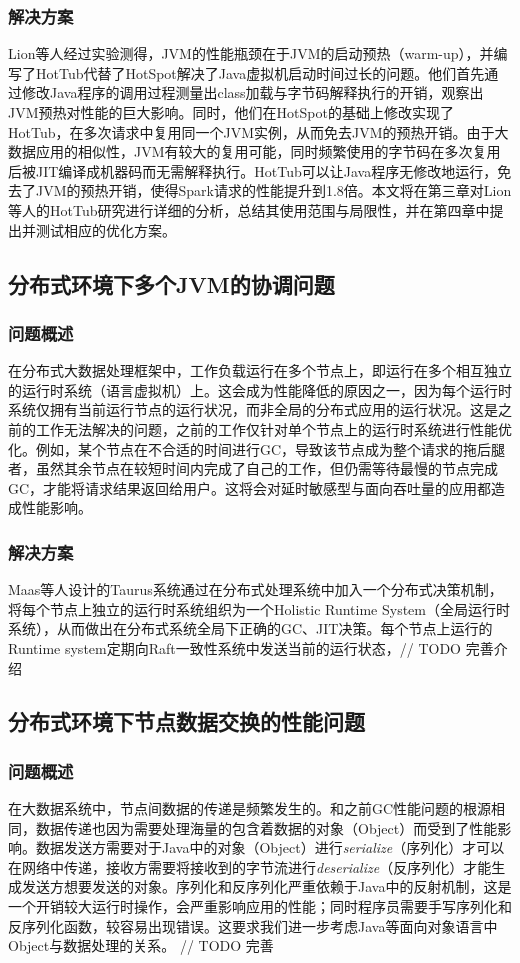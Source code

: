 \documentclass[lang=cn,11pt,a4paper,cite=authoryear]{elegantpaper}
\begin{document}
\subsubsection{解决方案}
Lion等人经过实验测得，JVM的性能瓶颈在于JVM的启动预热（warm-up），并编写了HotTub代替了HotSpot\cite{DBLP:conf/osdi/LionCSZGY16}解决了Java虚拟机启动时间过长的问题。他们首先通过修改Java程序的调用过程测量出class加载与字节码解释执行的开销，观察出JVM预热对性能的巨大影响。同时，他们在HotSpot的基础上修改实现了HotTub，在多次请求中复用同一个JVM实例，从而免去JVM的预热开销。由于大数据应用的相似性，JVM有较大的复用可能，同时频繁使用的字节码在多次复用后被JIT编译成机器码而无需解释执行。HotTub可以让Java程序无修改地运行，免去了JVM的预热开销，使得Spark请求的性能提升到1.8倍。本文将在第三章对Lion等人的HotTub研究进行详细的分析，总结其使用范围与局限性，并在第四章中提出并测试相应的优化方案。

\subsection{分布式环境下多个JVM的协调问题}
\subsubsection{问题概述}
在分布式大数据处理框架中，工作负载运行在多个节点上，即运行在多个相互独立的运行时系统（语言虚拟机）上。这会成为性能降低的原因之一，因为每个运行时系统仅拥有当前运行节点的运行状况，而非全局的分布式应用的运行状况。这是之前的工作无法解决的问题，之前的工作仅针对单个节点上的运行时系统进行性能优化。例如，某个节点在不合适的时间进行GC，导致该节点成为整个请求的拖后腿者，虽然其余节点在较短时间内完成了自己的工作，但仍需等待最慢的节点完成GC，才能将请求结果返回给用户。这将会对延时敏感型与面向吞吐量的应用都造成性能影响。
\subsubsection{解决方案}
Maas等人设计的Taurus\cite{DBLP:conf/asplos/MaasA0K16}系统通过在分布式处理系统中加入一个分布式决策机制，将每个节点上独立的运行时系统组织为一个Holistic Runtime System（全局运行时系统），从而做出在分布式系统全局下正确的GC、JIT决策。每个节点上运行的Runtime system定期向Raft一致性系统中发送当前的运行状态，// TODO 完善介绍

\subsection{分布式环境下节点数据交换的性能问题}
\subsubsection{问题概述}
在大数据系统中，节点间数据的传递是频繁发生的。和之前GC性能问题的根源相同，数据传递也因为需要处理海量的包含着数据的对象（Object）而受到了性能影响。数据发送方需要对于Java中的对象（Object）进行\textit{serialize}（序列化）才可以在网络中传递，接收方需要将接收到的字节流进行\textit{deserialize}（反序列化）才能生成发送方想要发送的对象。序列化和反序列化严重依赖于Java中的反射机制，这是一个开销较大运行时操作，会严重影响应用的性能；同时程序员需要手写序列化和反序列化函数，较容易出现错误。这要求我们进一步考虑Java等面向对象语言中Object与数据处理的关系。
// TODO 完善
\end{document}
